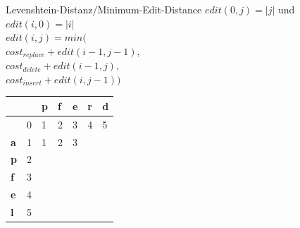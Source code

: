 \documentclass[aspectratio=169]{beamer}
\begin{document}
\begin{frame}[fragile]{Levenshtein-Distanz/Minimum-Edit-Distance}
$edit(0,j)=|j|$ und $edit(i,0)=|i|$\\
$edit(i,j)=min($\\
$cost_{replace} + edit(i-1,j-1),  $\\
$cost_{delete}+ edit(i-1,j),$\\
$cost_{insert}+ edit(i,j-1))  $\\
\begin{table}[]
\begin{tabular}{|l|l|l|l|l|l|l|}
\hline
           & \textbf{} & \textbf{p} & \textbf{f} & \textbf{e} & \textbf{r} & \textbf{d} \\ \hline
\textbf{}  & 0         & 1          & 2          & 3          & 4          & 5          \\ \hline
\textbf{a} & 1         & 1          & 2          & 3          &            &            \\ \hline
\textbf{p} & 2         &            &            &            &            &            \\ \hline
\textbf{f} & 3         &            &            &            &            &            \\ \hline
\textbf{e} & 4         &            &            &            &            &            \\ \hline
\textbf{l} & 5         &            &            &            &            &            \\ \hline
\end{tabular}
\end{table}
\end{frame}
\end{document}

